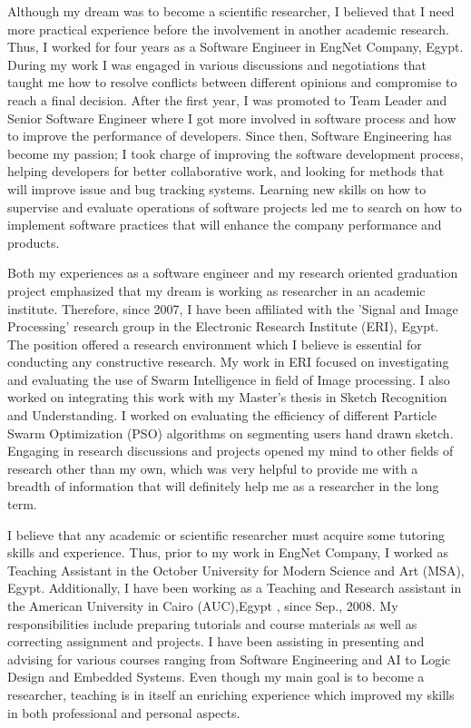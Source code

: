 \documentclass[12pt]{article}%
\begin{document}
	Although my dream was to become a scientific researcher, I believed that I need more practical experience before the involvement in another academic research. Thus, I worked for four years as a Software Engineer in EngNet Company, Egypt. During my work I was engaged in various discussions and negotiations that taught me how to resolve conflicts between different opinions and compromise to reach a final decision. After the first year, I was promoted to Team Leader and Senior Software Engineer where I got more involved in software process and how to improve the performance of developers. Since then, Software Engineering has become my passion; I took charge of improving the software development process, helping developers for better collaborative work, and looking for methods that will improve issue and bug tracking systems. Learning new skills on how to supervise and evaluate operations of software projects led me to search on how to implement software practices that will enhance the company performance and products.


 Both my experiences as a software engineer and my research oriented graduation project emphasized that my dream is working as researcher in an academic institute. Therefore, since 2007, I have been affiliated with the 'Signal and Image Processing' research group in the Electronic Research Institute (ERI), Egypt. The position offered a research environment which I believe is essential for conducting any constructive research. My work in ERI focused on investigating and evaluating the use of Swarm Intelligence in field of Image processing. I also worked on integrating this work with my Master's thesis in Sketch Recognition and Understanding. I worked on evaluating the efficiency of different Particle Swarm Optimization (PSO) algorithms on segmenting users hand drawn sketch. Engaging in research discussions and projects opened my mind to other fields of research other than my own, which was very helpful to provide me with a breadth of information that will definitely help me as a researcher in the long term.


	I believe that any academic or scientific researcher must acquire some tutoring skills and experience. Thus, prior to my work in EngNet Company, I worked as Teaching Assistant in the October University for Modern Science and Art (MSA), Egypt. Additionally, I have been working as a Teaching and Research assistant in the American University in Cairo (AUC),Egypt , since Sep., 2008. My responsibilities include preparing tutorials and course materials as well as correcting assignment and projects. I have been assisting in presenting and advising for various courses ranging from Software Engineering and AI to Logic Design and Embedded Systems. Even though my main goal is to become a researcher, teaching is in itself an enriching experience which improved my skills in both professional and personal aspects.
\end{document}

